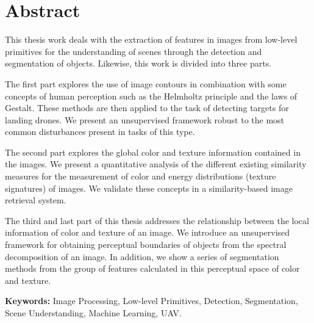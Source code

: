 \chapter*{Abstract}


\noindent This thesis work deals with the extraction of features in images from low-level primitives for the understanding of scenes through the detection and segmentation of objects. Likewise, this work is divided into three parts.
\newline 

\noindent The first part explores the use of image contours in combination with some concepts of human perception such as the Helmholtz principle and the laws of Gestalt. These methods are then applied to the task of detecting targets for landing drones. We present an unsupervised framework robust to the most common disturbances present in tasks of this type.
\newline

\noindent The second part explores the global color and texture information contained in the images. We present a quantitative analysis of the different existing similarity measures for the measurement of color and energy distributions (texture signatures) of images. We validate these concepts in a similarity-based image retrieval system.
\newline 

\noindent The third and last part of this thesis addresses the relationship between the local information of color and texture of an image. We introduce an unsupervised framework for obtaining perceptual boundaries of objects from the spectral decomposition of an image. In addition, we show a series of segmentation methods from the group of features calculated in this perceptual space of color and texture.

\vspace*{\fill}

\textbf{Keywords:} Image Processing, Low-level Primitives, Detection, Segmentation, Scene Understanding, Machine Learning, UAV.